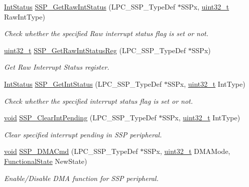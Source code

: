 \begin{DoxyCompactItemize}
\hyperlink{group___l_p_c___types___public___types_gab7d263072f745b4f3913fb0afc434c4e}{Int\+Status} \hyperlink{group___s_s_p___public___functions_gade02a6e43332586e8120f782b588dfdc}{S\+S\+P\+\_\+\+Get\+Raw\+Int\+Status} (L\+P\+C\+\_\+\+S\+S\+P\+\_\+\+Type\+Def $\ast$S\+S\+Px, \hyperlink{_p_e___types_8h_a33594304e786b158f3fb30289278f5af}{uint32\+\_\+t} Raw\+Int\+Type)
\begin{DoxyCompactList}\small\item\em Check whether the specified Raw interrupt status flag is set or not. \end{DoxyCompactList}\item 
\hyperlink{_p_e___types_8h_a33594304e786b158f3fb30289278f5af}{uint32\+\_\+t} \hyperlink{group___s_s_p___public___functions_ga49e82b4a7010ad2de022399475e1f60b}{S\+S\+P\+\_\+\+Get\+Raw\+Int\+Status\+Reg} (L\+P\+C\+\_\+\+S\+S\+P\+\_\+\+Type\+Def $\ast$S\+S\+Px)
\begin{DoxyCompactList}\small\item\em Get Raw Interrupt Status register. \end{DoxyCompactList}\item 
\hyperlink{group___l_p_c___types___public___types_gab7d263072f745b4f3913fb0afc434c4e}{Int\+Status} \hyperlink{group___s_s_p___public___functions_gae3f869e56a14351d6c4e2485131273e8}{S\+S\+P\+\_\+\+Get\+Int\+Status} (L\+P\+C\+\_\+\+S\+S\+P\+\_\+\+Type\+Def $\ast$S\+S\+Px, \hyperlink{_p_e___types_8h_a33594304e786b158f3fb30289278f5af}{uint32\+\_\+t} Int\+Type)
\begin{DoxyCompactList}\small\item\em Check whether the specified interrupt status flag is set or not. \end{DoxyCompactList}\item 
\hyperlink{usb__devapi_8h_afabf60e7f57651d6d595a02c75f07cd0}{void} \hyperlink{group___s_s_p___public___functions_ga746ab6c5b143261a45082008b83e6dc8}{S\+S\+P\+\_\+\+Clear\+Int\+Pending} (L\+P\+C\+\_\+\+S\+S\+P\+\_\+\+Type\+Def $\ast$S\+S\+Px, \hyperlink{_p_e___types_8h_a33594304e786b158f3fb30289278f5af}{uint32\+\_\+t} Int\+Type)
\begin{DoxyCompactList}\small\item\em Clear specified interrupt pending in S\+SP peripheral. \end{DoxyCompactList}\item 
\hyperlink{usb__devapi_8h_afabf60e7f57651d6d595a02c75f07cd0}{void} \hyperlink{group___s_s_p___public___functions_gac69f6e59bf67fdef7a38bdbaa8d3e8ae}{S\+S\+P\+\_\+\+D\+M\+A\+Cmd} (L\+P\+C\+\_\+\+S\+S\+P\+\_\+\+Type\+Def $\ast$S\+S\+Px, \hyperlink{_p_e___types_8h_a33594304e786b158f3fb30289278f5af}{uint32\+\_\+t} D\+M\+A\+Mode, \hyperlink{agilefox_2library_2inc_2stm32f10x__type_8h_ac9a7e9a35d2513ec15c3b537aaa4fba1}{Functional\+State} New\+State)
\begin{DoxyCompactList}\small\item\em Enable/\+Disable D\+MA function for S\+SP peripheral. \end{DoxyCompactList}\end{DoxyCompactItemize}


